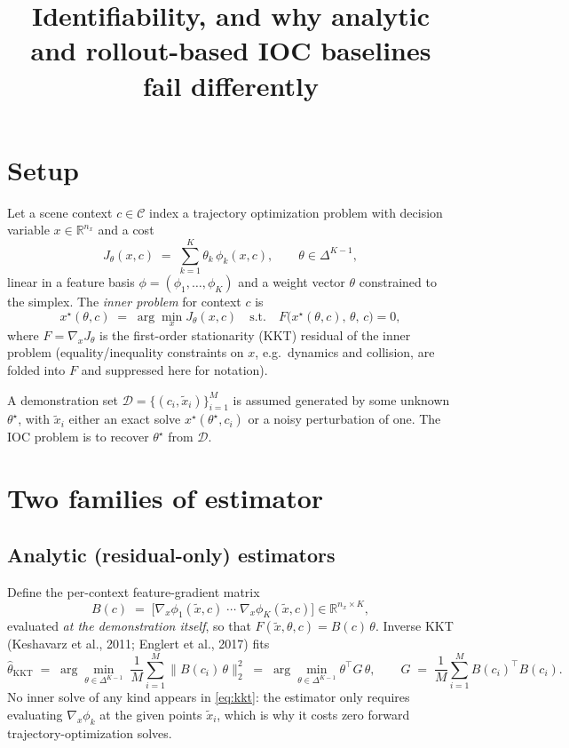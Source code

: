 \documentclass[11pt]{article}
\title{Identifiability, and why analytic and rollout-based IOC baselines\\
fail differently}
\author{}
\date{}
\newcommand{\R}{\mathbb{R}}
\newcommand{\theovec}{\theta}
\newcommand{\xdemo}{\tilde{x}}
\begin{document}
\maketitle

\section{Setup}

Let a scene context $c \in \mathcal{C}$ index a trajectory optimization problem
with decision variable $x \in \R^{n_x}$ and a cost
\begin{equation}
  J_\theovec(x, c) \;=\; \sum_{k=1}^{K} \theovec_k\, \phi_k(x, c),
  \qquad \theovec \in \Delta^{K-1},
\end{equation}
linear in a feature basis $\phi = (\phi_1,\dots,\phi_K)$ and a weight vector
$\theovec$ constrained to the simplex. The \emph{inner problem} for context $c$
is
\begin{equation}
  x^\star(\theovec, c) \;=\; \arg\min_x J_\theovec(x, c)
  \quad\text{s.t.}\quad
  F\big(x^\star(\theovec,c),\, \theovec,\, c\big) = 0,
\end{equation}
where $F = \nabla_x J_\theovec$ is the first-order stationarity (KKT) residual
of the inner problem (equality/inequality constraints on $x$, e.g.\ dynamics
and collision, are folded into $F$ and suppressed here for notation).

A demonstration set $\mathcal{D} = \{(c_i, \xdemo_i)\}_{i=1}^{M}$ is assumed
generated by some unknown $\theovec^\star$, with $\xdemo_i$ either an exact
solve $x^\star(\theovec^\star, c_i)$ or a noisy perturbation of one. The IOC
problem is to recover $\theovec^\star$ from $\mathcal{D}$.

\section{Two families of estimator}

\subsection{Analytic (residual-only) estimators}

Define the per-context feature-gradient matrix
\begin{equation}
  B(c) \;=\; \big[\nabla_x \phi_1(\xdemo, c) \;\cdots\; \nabla_x \phi_K(\xdemo,
  c)\big] \in \R^{n_x \times K},
\end{equation}
evaluated \emph{at the demonstration itself}, so that
$F(\xdemo, \theovec, c) = B(c)\,\theovec$.
Inverse KKT (Keshavarz et al., 2011; Englert et al., 2017) fits
\begin{equation}
  \hat\theovec_{\mathrm{KKT}}
  \;=\; \arg\min_{\theovec \in \Delta^{K-1}} \;
  \frac{1}{M}\sum_{i=1}^M \big\| B(c_i)\,\theovec \big\|_2^2
  \;=\; \arg\min_{\theovec \in \Delta^{K-1}} \theovec^\top G\, \theovec,
  \qquad
  G \;=\; \frac{1}{M}\sum_{i=1}^M B(c_i)^\top B(c_i).
  \label{eq:kkt}
\end{equation}
No inner solve of any kind appears in \eqref{eq:kkt}: the estimator only
requires evaluating $\nabla_x \phi_k$ at the given points $\xdemo_i$, which is
why it costs zero forward trajectory-optimization solves.
\end{document}
